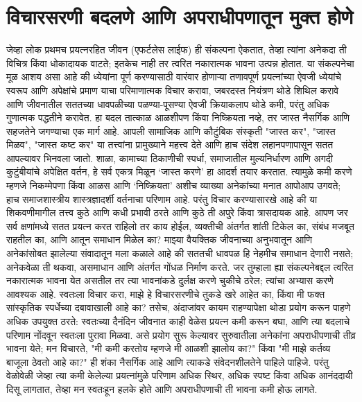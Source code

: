  \chapter{विचारसरणी बदलणे आणि अपराधीपणातून मुक्त होणे}
जेव्हा लोक प्रथमच प्रयत्नरहित जीवन (एफर्टलेस लाईफ) ही संकल्पना ऐकतात, तेव्हा त्यांना अनेकदा ती विचित्र किंवा धोकादायक वाटते; इतकेच नाही तर त्वरित नकारात्मक भावना उत्पन्न होतात. या संकल्पनेचा मूळ आशय असा आहे की ध्येयांना पूर्ण करण्यासाठी वारंवार होणाऱ्या तणावपूर्ण प्रयत्नांच्या ऐवजी ध्येयांचे स्वरूप आणि अपेक्षांचे प्रमाण याचा परिमाणात्मक विचार करावा, जबरदस्त नियंत्रण थोडे शिथिल करावे आणि जीवनातील सततच्या धावपळीच्या पळण्या-पूसण्या ऐवजी क्रियाकलाप थोडे कमी, परंतु अधिक गुणात्मक पद्धतीने करावेत. हा बदल तात्काळ आळशीपण किंवा निष्क्रियता नव्हे, तर जास्त नैसर्गिक आणि सहजतेने जगण्याचा एक मार्ग आहे.
आपली सामाजिक आणि कौटुंबिक संस्कृती "जास्त कर", "जास्त मिळव", "जास्त कष्ट कर" या तत्त्वांना प्रामुख्याने महत्त्व देते आणि हाच संदेश लहानपणापासून सतत आपल्यावर भिनवला जातो. शाळा, कामाच्या ठिकाणीची स्पर्धा, समाजातील मुल्यनिर्धारण आणि अगदी कुटुंबीयांचे अपेक्षित वर्तन, हे सर्व एकत्र मिळून ‘जास्त करणे’ हा आदर्श तयार करतात. त्यामुळे कमी करणे म्हणजे निकम्मेपणा किंवा आळस आणि ‘निष्क्रियता’ अशीच व्याख्या अनेकांच्या मनात आपोआप उगवते; हाच समाजशास्त्रीय शास्त्रज्ञादर्शी वर्तनाचा परिणाम आहे.
परंतु विचार करण्यासारखे आहे की या शिकवणीमागील तत्त्व कुठे आणि कधी प्रभावी ठरते आणि कुठे ती अपुरे किंवा त्रासदायक आहे. आपण जर सर्व क्षणांमध्ये सतत प्रयत्न करत राहिलो तर काय होईल, व्यक्तीची अंतर्गत शांती टिकेल का, संबंध मजबूत राहतील का, आणि आतून समाधान मिळेल का? माझ्या वैयक्तिक जीवनाच्या अनुभवातून आणि अनेकांसोबत झालेल्या संवादातून मला कळाले आहे की सततची धावपळ हि नेहमीच समाधान देणारी नसते; अनेकवेळा ती थकवा, असमाधान आणि अंतर्गत गोंधळ निर्माण करते.
जर तुम्हाला ह्या संकल्पनेबद्दल त्वरित नकारात्मक भावना येत असतील तर त्या भावनांकडे दुर्लक्ष करणे चुकीचे ठरेल; त्यांचा अभ्यास करणे आवश्यक आहे. स्वतःला विचार करा, माझे हे विचारसरणीचे तुकडे खरे आहेत का, किंवा मी फक्त सांस्कृतिक स्पर्धेच्या दबावाखाली आहे का? तसेच, अंदाजांवर कायम राहण्यापेक्षा थोडा प्रयोग करून पाहणे अधिक उपयुक्त ठरते: स्वतःच्या दैनंदिन जीवनात काही वेळेस प्रयत्न कमी करून बघा, आणि त्या बदलाचे परिणाम नोंदवून स्वतःला पुरावा मिळवा.
असे प्रयोग सुरू केल्यावर सुरुवातीला अनेकांना अपराधीपणाची तीव्र भावना येते; मन विचारते, "मी कमी करतोय म्हणजे मी आळशी झालोय का?" किंवा "मी माझे कर्तव्य बाजूला ठेवतो आहे का?" ही शंका नैसर्गिक आहे आणि त्याकडे संवेदनशीलतेने पाहिले पाहिजे. परंतु वेळोवेळी जेव्हा त्या कमी केलेल्या प्रयत्नांमुळे परिणाम अधिक स्थिर, अधिक स्पष्ट किंवा अधिक आनंददायी दिसू लागतात, तेव्हा मन स्वतःहून हलके होते आणि अपराधीपणाची ती भावना कमी होऊ लागते.

